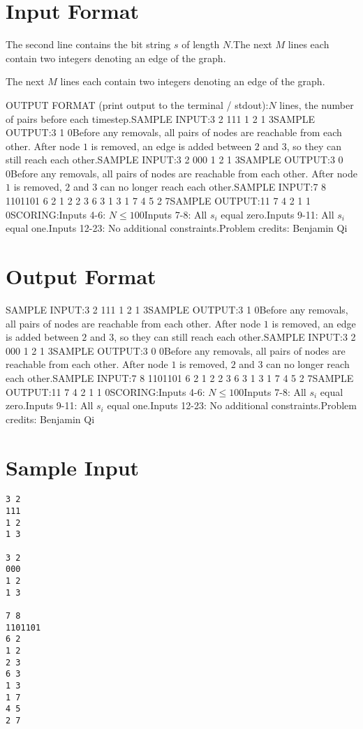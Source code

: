 \documentclass[12pt]{article}
\begin{document}
\section*{Input Format}
The second line contains the bit string $s$ of length $N$.The next $M$ lines each contain two integers denoting an edge of the graph.

The next $M$ lines each contain two integers denoting an edge of the graph.

OUTPUT FORMAT (print output to the terminal / stdout):$N$ lines, the number of pairs before each timestep.SAMPLE INPUT:3 2
111
1 2
1 3SAMPLE OUTPUT:3
1
0Before any removals, all pairs of nodes are reachable from each other. After
node $1$ is removed, an edge is added between $2$ and $3$, so they can still
reach each other.SAMPLE INPUT:3 2
000
1 2
1 3SAMPLE OUTPUT:3
0
0Before any removals, all pairs of nodes are reachable from each other. After
node $1$ is removed, $2$ and $3$ can no longer reach each other.SAMPLE INPUT:7 8
1101101
6 2
1 2
2 3
6 3
1 3
1 7
4 5
2 7SAMPLE OUTPUT:11
7
4
2
1
1
0SCORING:Inputs 4-6: $N\le 100$Inputs 7-8: All $s_i$ equal zero.Inputs 9-11: All $s_i$ equal one.Inputs 12-23: No additional
constraints.Problem credits: Benjamin Qi

\section*{Output Format}
SAMPLE INPUT:3 2
111
1 2
1 3SAMPLE OUTPUT:3
1
0Before any removals, all pairs of nodes are reachable from each other. After
node $1$ is removed, an edge is added between $2$ and $3$, so they can still
reach each other.SAMPLE INPUT:3 2
000
1 2
1 3SAMPLE OUTPUT:3
0
0Before any removals, all pairs of nodes are reachable from each other. After
node $1$ is removed, $2$ and $3$ can no longer reach each other.SAMPLE INPUT:7 8
1101101
6 2
1 2
2 3
6 3
1 3
1 7
4 5
2 7SAMPLE OUTPUT:11
7
4
2
1
1
0SCORING:Inputs 4-6: $N\le 100$Inputs 7-8: All $s_i$ equal zero.Inputs 9-11: All $s_i$ equal one.Inputs 12-23: No additional
constraints.Problem credits: Benjamin Qi

\section*{Sample Input}
\begin{verbatim}
3 2
111
1 2
1 3

3 2
000
1 2
1 3

7 8
1101101
6 2
1 2
2 3
6 3
1 3
1 7
4 5
2 7
\end{verbatim}
\end{document}
